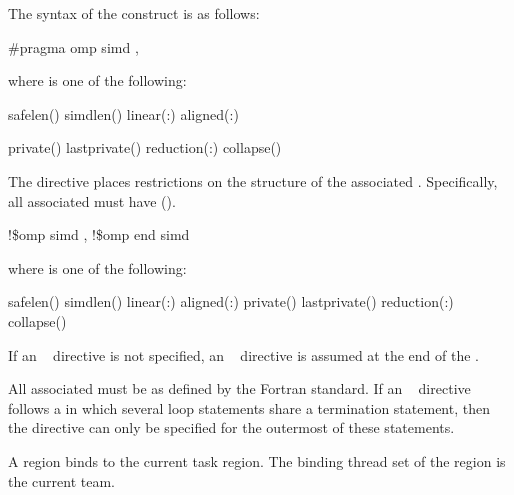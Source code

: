 \syntax
The syntax of the  construct is as follows:

\ccppspecificstart
\begin{boxedcode}
\#pragma omp simd \plc{[clause[ [},\plc{] clause] ... ] new-line}
\end{boxedcode}

where  is one of the following:

\begin{indentedcodelist}
safelen()
simdlen()
linear(\plc{list[ }:\plc{ linear-step]})
aligned(\plc{list[ }:\plc{ alignment]})

private()
lastprivate()
reduction(:)
collapse()
\end{indentedcodelist}

The  directive places restrictions on the structure of the associated . 
Specifically, all associated  must have  
().
\ccppspecificend

\fortranspecificstart
\begin{boxedcode}
!\$omp simd \plc{[clause[ [},\plc{] clause ... ]}
\plc{[}!\$omp end simd\plc{]}
\end{boxedcode}

where  is one of the following:

\begin{indentedcodelist}
safelen()
simdlen()
linear(\plc{list[ }:\plc{ linear-step]})
aligned(\plc{list[ }:\plc{ alignment]})
private()
lastprivate()
reduction(:)
collapse()
\end{indentedcodelist}

If an ~ directive is not specified, an ~ directive is assumed at the end 
of the .

All associated  must be  as defined by the Fortran standard. If an 
~ directive follows a  in which several loop statements share a  
termination statement, then the directive can only be specified for the outermost of these 
 statements. 
\fortranspecificend

\binding
A  region binds to the current task region. The binding thread set of the  
region is the current team.

